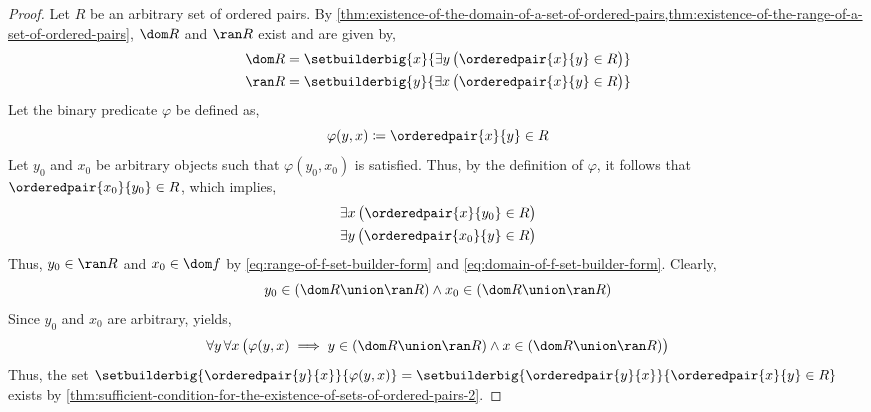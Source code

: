 \begin{proof}
    Let \( R \) be an arbitrary set of ordered pairs.
    By \cref{thm:existence-of-the-domain-of-a-set-of-ordered-pairs,thm:existence-of-the-range-of-a-set-of-ordered-pairs}, \( \dom R \)
    and \( \ran R \) exist and are given by,
    \begin{align}
        \dom R &=
        \setbuilderbig{x}{\exists y \, \big( \orderedpair{x}{y} \in R \big)} \label{eq:domain-of-f-set-builder-form}\\
        \ran R &=
        \setbuilderbig{y}{\exists x \, \big( \orderedpair{x}{y} \in R \big)} \label{eq:range-of-f-set-builder-form}
    \end{align}
    Let the binary predicate \( \varphi \) be defined as,
    \begin{equation*}
        \varphi(y, x) \coloneq \orderedpair{x}{y} \in R
    \end{equation*}
    Let \( y_{0} \) and \( x_{0} \) be arbitrary objects such that \( \varphi(y_{0}, x_{0}) \) is satisfied. Thus, by
    the definition of \( \varphi \), it follows that \( \orderedpair{x_{0}}{y_{0}} \in R \), which implies,
    \begin{gather*}
        \exists x \, \big( \orderedpair{x}{y_{0}} \in R \big) \\
        \exists y \, \big( \orderedpair{x_{0}}{y} \in R \big)
    \end{gather*}
    Thus, \( y_{0} \in \ran R \) and \( x_{0} \in \dom f \) by \eqref{eq:range-of-f-set-builder-form}
    and \eqref{eq:domain-of-f-set-builder-form}. Clearly,
    \begin{equation*}
        y_{0} \in \mleft( \dom R \union \ran R \mright)
        \land
        x_{0} \in \mleft( \dom R \union \ran R \mright)
    \end{equation*}
    Since \( y_{0} \) and \( x_{0} \) are arbitrary,  yields,
    \begin{equation*}
        \forall y \, \forall x \, \big( \varphi(y, x) \implies y \in \mleft( \dom R \union \ran R \mright)
        \land x \in \mleft( \dom R \union \ran R \mright) \big)
    \end{equation*}
    Thus, the set \( \setbuilderbig{\orderedpair{y}{x}}{\varphi(y,x)} = \setbuilderbig{\orderedpair{y}{x}}{\orderedpair{x}{y} \in R} \)
    exists by \cref{thm:sufficient-condition-for-the-existence-of-sets-of-ordered-pairs-2}.
\end{proof}

